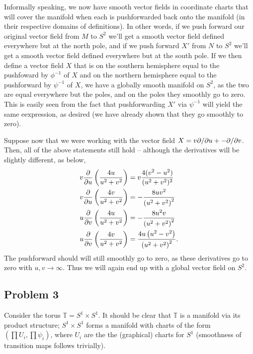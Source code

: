 \documentclass{../../mathnotes}
\begin{document}
Informally speaking, we now have smooth vector fields in coordinate charts that will cover the manifold when
each is pushforwarded back onto the manifold (in their respective domains of definitions). In other words, if
we push forward our original vector field from $M$ to $S^2$ we'll get a smooth vector field defined everywhere
but at the north pole, and if we push forward $X'$ from $N$ to $S^2$ we'll get a smooth vector field defined
everywhere but at the south pole. If we then define a vector field $X$ that is on the southern hemisphere
equal to the pushfoward by $\phi^{-1}$ of $X$ and on the northern hemisphere equal to the pushforward by
$\psi^{-1}$ of $X$, we have a globally smooth manifold on $S^2$, as the two are equal everywhere but the poles,
and on the poles they smoothly go to zero. This is easily seen from the fact that pushforwarding $X'$ via
$\psi^{-1}$ will yield the same eexpression, as desired (we have already shown that they go smoothly to zero).

Suppose now that we were working with the vector field $X=v\partial/\partial u+-\partial/\partial v$. Then, all of the above statements
still hold -- although the derivatives will be slightly different, as below,
\begin{align*}
    v\frac{\partial}{\partial u}\left( \frac{4u}{u^2+v^2} \right)&=v\frac{4(v^2-u^2)}{(u^2+v^2)^2}\\
    v\frac{\partial}{\partial u}\left( \frac{4v}{u^2+v^2} \right)&=-\frac{8 u v^2}{\left(u^2+v^2\right)^2}\\
    u\frac{\partial}{\partial v}\left( \frac{4u}{u^2+v^2} \right)&=-\frac{8 u^2 v}{\left(u^2+v^2\right)^2}\\
    u\frac{\partial}{\partial v}\left( \frac{4v}{u^2+v^2} \right)&=\frac{4 u \left(u^2-v^2\right)}{\left(u^2+v^2\right)^2}.
\end{align*}
The pushforward should will still smoothly go to zero, as these derivatives go to zero with $u,v\to\infty$.
Thus we will again end up with a global vector field on $S^2$.


\subsection*{Problem 3}

Consider the torus $\mathbb{T}=S^1\times S^1$. It should be clear that $\mathbb{T}$ is a manifold via its
product structure; $S^1\times S^1$ forms a manifold with charts of the form $(\prod U_i, \prod\psi_i)$, where $U_i$ are
the the (graphical) charts for $S^1$ (smoothness of transition maps follows trivially).
\end{document}

